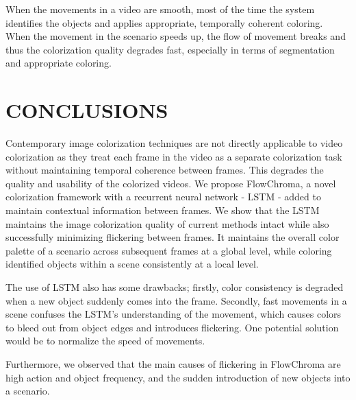 \documentclass[10pt,twocolumn,letterpaper]{article}
\begin{document}
When the movements in a video are smooth, most of the time the system identifies the objects and applies appropriate, temporally coherent coloring. When the movement in the scenario speeds up, the flow of movement breaks and thus the colorization quality degrades fast, especially in terms of segmentation and appropriate coloring.

\section{CONCLUSIONS}

Contemporary image colorization techniques are not directly applicable to video colorization as they treat each frame in the video as a separate colorization task without maintaining temporal coherence between frames. This degrades the quality and usability of the colorized videos. We propose FlowChroma, a novel colorization framework with a recurrent neural network - LSTM - added to maintain contextual information between frames.
We show that the LSTM maintains the image colorization quality of current methods intact while also successfully minimizing flickering between frames. It maintains the overall color palette of a scenario across subsequent frames at a global level, while coloring identified objects within a scene consistently at a local level. 

The use of LSTM also has some drawbacks; firstly, color consistency is degraded when a new object suddenly comes into the frame. Secondly, fast movements in a scene confuses the LSTM's understanding of the movement, which causes colors to bleed out from object edges and introduces flickering. One potential solution would be to normalize the speed of movements.

Furthermore, we observed that the main causes of flickering in FlowChroma are high action and object frequency, and the sudden introduction of new objects into a scenario. 





{\small


}
\end{document}
